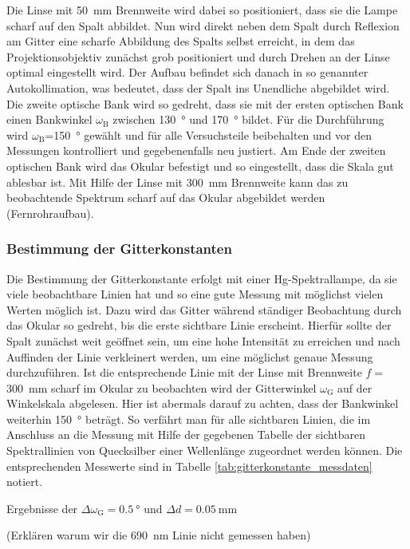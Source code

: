 \documentclass[11pt, a4paper]{article}
\numberwithin{equation}{section}
\begin{document}
Die Linse mit \SI{50}{\milli\metre} Brennweite wird dabei so positioniert, dass sie die Lampe scharf auf den Spalt abbildet.
Nun wird direkt neben dem Spalt durch Reflexion am Gitter eine scharfe Abbildung des Spalts selbst erreicht, in dem das Projektionsobjektiv zunächst grob positioniert und durch Drehen an der Linse optimal eingestellt wird.
Der Aufbau befindet sich danach in so genannter Autokollimation, was bedeutet, dass der Spalt ins Unendliche abgebildet wird.
Die zweite optische Bank wird so gedreht, dass sie mit der ersten optischen Bank einen Bankwinkel $\omega_\text{B}$ zwischen \SI{130}{\degree} und \SI{170}{\degree} bildet.
Für die Durchführung wird $\omega_\text{B}$=\SI{150}{\degree} gewählt und  für alle Versuchsteile beibehalten und vor den Messungen kontrolliert und gegebenenfalls neu justiert.
Am Ende der zweiten optischen Bank wird das Okular befestigt und so eingestellt, dass die Skala gut ablesbar ist.
Mit Hilfe der Linse mit \SI{300}{\milli\metre} Brennweite kann das zu beobachtende Spektrum scharf auf das Okular abgebildet werden (Fernrohraufbau).

\subsubsection{Bestimmung der Gitterkonstanten}
\label{sssec:durchfuehrung_gitterkonstante}
Die Bestimmung der Gitterkonstante erfolgt mit einer Hg-Spektrallampe, da sie viele beobachtbare Linien hat und so eine gute Messung mit möglichst vielen Werten möglich ist.
Dazu wird das Gitter während ständiger Beobachtung durch das Okular so gedreht, bis die erste sichtbare Linie erscheint.
Hierfür sollte der Spalt zunächst weit geöffnet sein, um eine hohe Intensität zu erreichen und nach Auffinden der Linie verkleinert werden, um eine möglichst genaue Messung durchzuführen.
Ist die entsprechende Linie mit der Linse mit Brennweite $f=$\SI{300}{\milli\metre} scharf im Okular zu beobachten wird der Gitterwinkel $\omega_\text{G}$ auf der Winkelskala abgelesen.
Hier ist abermals darauf zu achten, dass der Bankwinkel weiterhin \SI{150}{\degree} beträgt.
So verfährt man für alle sichtbaren Linien, die im Anschluss an die Messung mit Hilfe der gegebenen Tabelle der sichtbaren Spektrallinien von Quecksilber einer Wellenlänge zugeordnet werden können.
Die entsprechenden Messwerte sind in Tabelle \ref{tab:gitterkonstante_messdaten} notiert.
\begin{table}[h]
	\centering
	
	\caption{Ergebnisse der $\Delta \omega_\mathrm{G} = \SI{0.5}{\degree}$ und $\Delta d = \SI{0.05}{\milli\metre}$}
	\label{tab:gitterkonstante_messdaten}
\end{table}
(Erklären warum wir die \SI{690}{\nano\metre} Linie nicht gemessen haben)
\end{document}
